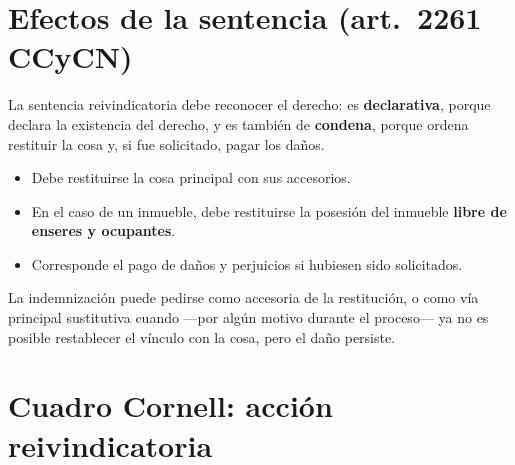 \documentclass[12pt,oneside]{book}
\begin{document}
\section{Efectos de la sentencia (art.\ 2261 CCyCN)}

La sentencia reivindicatoria debe reconocer el derecho: es \textbf{declarativa}, porque declara la existencia del derecho, y es también de \textbf{condena}, porque ordena restituir la cosa y, si fue solicitado, pagar los daños.

\begin{itemize}
    \item Debe restituirse la cosa principal con sus accesorios.
    \item En el caso de un inmueble, debe restituirse la posesión del inmueble \textbf{libre de enseres y ocupantes}.
    \item Corresponde el pago de daños y perjuicios si hubiesen sido solicitados.
\end{itemize}

\begin{important}
La indemnización puede pedirse como accesoria de la restitución, o como vía principal sustitutiva cuando ---por algún motivo durante el proceso--- ya no es posible restablecer el vínculo con la cosa, pero el daño persiste.
\end{important}

\section{Cuadro Cornell: acción reivindicatoria}
\end{document}
